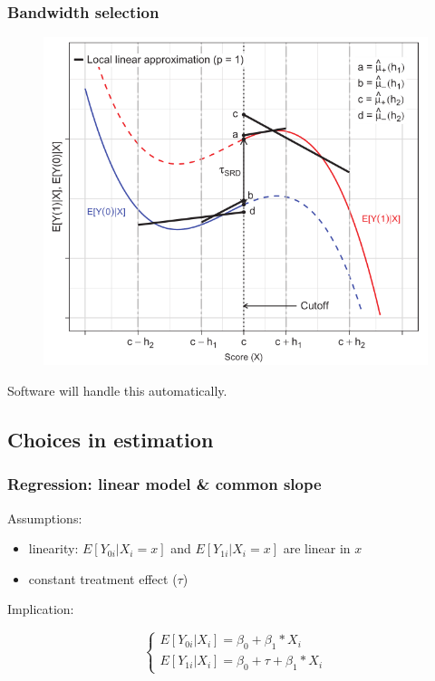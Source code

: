\documentclass[12pt,english,dvipsnames,aspectratio=169,handout]{beamer}\usepackage[]{graphicx}\usepackage[]{xcolor}
\begin{document}
\begin{frame}
\frametitle{Bandwidth selection}

\begin{figure}
\centering
\includegraphics[scale=0.35]{../04-figures/07/08.PNG}
\caption{\cite{cattaneo_practical_2019}}
\end{figure}

Software will handle this automatically.
\end{frame}


\subsection{Choices in estimation}
\begin{frame}
\frametitle{Regression: linear model \& common slope}
Assumptions:

\begin{itemize}
\item linearity: $E[Y_{0i} | X_i = x]$ and $E[Y_{1i} | X_i = x]$ are linear in $x$
\item constant treatment effect ($\tau$)
\end{itemize}\bigskip
\pause

Implication:

\begin{equation}
\begin{cases}
E[Y_{0i} | X_i] = \beta_0 + \beta_1*X_i \\
E[Y_{1i} | X_i] = \beta_0 + \tau + \beta_1*X_i
\end{cases}
\end{equation}

\end{frame}
\end{document}
